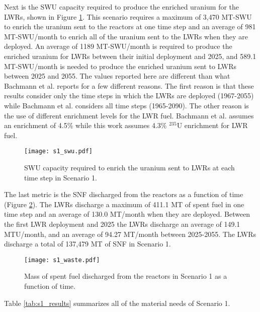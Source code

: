 Next is the \gls{SWU} capacity required 
to produce the enriched uranium for the \glspl{LWR}, 
shown in Figure \ref{fig:swu1}. This scenario requires a maximum of 3,470 
MT-SWU to 
enrich the uranium sent to the reactors at one time step and an average of 
981 MT-SWU/month to enrich all of the uranium sent to 
the \glspl{LWR} when they are deployed. An average of 
1189 MT-SWU/month is required to produce the enriched uranium 
for \glspl{LWR} between their initial deployment and 2025, and 
589.1 MT-SWU/month is needed to produce the 
enriched uranium sent to \glspl{LWR} between 2025 and 2055. The values 
reported here are different than what Bachmann et al. \cite{bachmann_enrichment_2021}
reports for a few different reasons. The first reason is that these results  
consider only
the time steps in which the \glspl{LWR} are deployed (1967-2055) while Bachmann et al. 
considers all time steps (1965-2090). The other reason
is the use of different enrichment levels for the \gls{LWR} fuel. 
Bachmann et al. assumes an enrichment of 4.5\% while this work assumes 4.3\%
$^{235}$U enrichment for \gls{LWR} fuel. 


\begin{figure}[h!]
    \centering
    \texttt{[image: s1\_swu.pdf]}
    \caption{SWU capacity required to enrich the uranium sent to LWRs at each time step in Scenario 1.}
    \label{fig:swu1}
\end{figure}

The last metric is the \gls{SNF} discharged from the reactors as a function of
time (Figure \ref{fig:waste1}). The \glspl{LWR} discharge a maximum of 411.1 MT 
of spent fuel in one time step and an average of 130.0 MT/month when they are 
deployed. Between the first \gls{LWR} deployment and 2025 the \glspl{LWR} 
discharge an average of 149.1 MTU/month, and an average of 94.27 MT/month  
between 2025-2055. The \glspl{LWR} discharge a total of 137,479 MT of \gls{SNF} 
in Scenario 1. 

\begin{figure}[h!]
    \centering
    \texttt{[image: s1\_waste.pdf]}
    \caption{Mass of spent fuel discharged from the reactors in Scenario 1 as a function of time.}
    \label{fig:waste1}
\end{figure}

Table \ref{tab:s1_results} summarizes all of the material needs of Scenario 1. 

